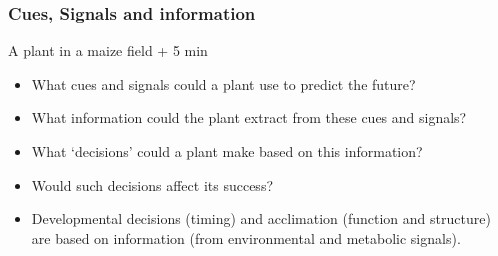 \documentclass[10pt]{beamer}
\begin{document}
\begin{frame}
\frametitle{Cues, Signals and information \Discussion}
\begin{block}{A plant in a maize field  + 5 min}
  \begin{itemize}
    \item What cues and signals could a plant use to predict the future?
    \item What information could the plant extract from these cues and signals?
    \item What `decisions' could a plant make based on this information?
    \item Would such decisions affect its success?
    \item Developmental decisions (timing) and acclimation (function and structure) are based on information (from environmental and metabolic signals).
   \end{itemize}
  \end{block}
\end{frame}
\end{document}
